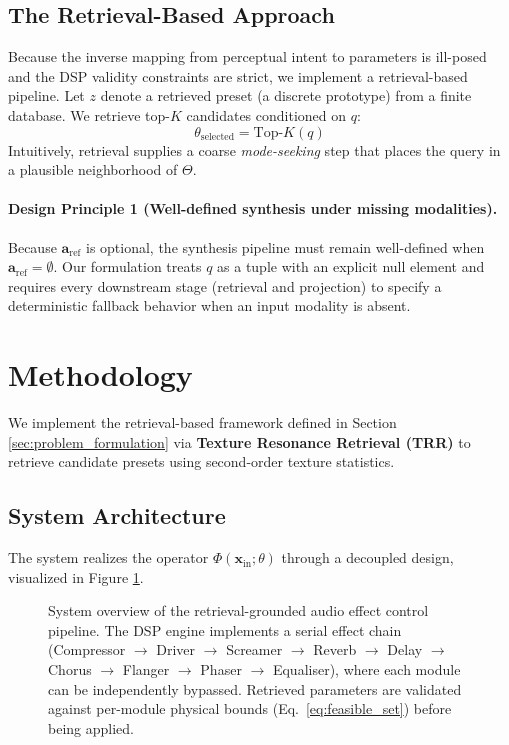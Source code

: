 \subsection{The Retrieval-Based Approach}
Because the inverse mapping from perceptual intent to parameters is ill-posed and the DSP validity constraints are strict, we implement a retrieval-based pipeline. Let $z$ denote a retrieved preset (a discrete prototype) from a finite database. We retrieve top-$K$ candidates conditioned on $q$:
\begin{equation}
	\theta_{\text{selected}} = \text{Top-}K(q)
\end{equation}
Intuitively, retrieval supplies a coarse \textit{mode-seeking} step that places the query in a plausible neighborhood of $\Theta$.
\paragraph{Design Principle 1 (Well-defined synthesis under missing modalities).}
Because $\mathbf{a}_{\text{ref}}$ is optional, the synthesis pipeline must remain well-defined when $\mathbf{a}_{\text{ref}}=\emptyset$. Our formulation treats $q$ as a tuple with an explicit null element and requires every downstream stage (retrieval and projection) to specify a deterministic fallback behavior when an input modality is absent.

\section{Methodology}
\label{sec:methodology}

We implement the retrieval-based framework defined in Section \ref{sec:problem_formulation} via \textbf{Texture Resonance Retrieval (TRR)} to retrieve candidate presets using second-order texture statistics.

\subsection{System Architecture}
\label{ssec:architecture}

The system realizes the operator $\Phi(\mathbf{x}_{\text{in}}; \theta)$ through a decoupled design, visualized in Figure \ref{fig:architecture}.

\begin{figure}[t]
\centering
\resizebox{\textwidth}{!}{}
\caption[System overview]{System overview of the retrieval-grounded audio effect control pipeline. The DSP engine implements a serial effect chain (Compressor $\to$ Driver $\to$ Screamer $\to$ Reverb $\to$ Delay $\to$ Chorus $\to$ Flanger $\to$ Phaser $\to$ Equaliser), where each module can be independently bypassed. Retrieved parameters are validated against per-module physical bounds (Eq.~\ref{eq:feasible_set}) before being applied.}
\label{fig:architecture}
\end{figure}

